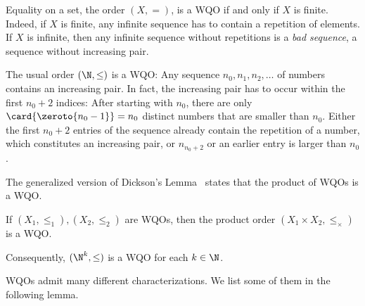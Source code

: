 \documentclass[../../diss.tex]{subfiles}
\begin{document}
\begin{example}%
\label{Example:WQO}%
    \begin{thmenumerate}[a)]
        \item
            Equality on a set, \ie the order $(X,=)$, is a WQO if and only if $X$ is finite.
            Indeed, if $X$ is finite, any infinite sequence has to contain a repetition of elements.
            If $X$ is infinite, then any infinite sequence without repetitions is a \emph{bad sequence}, a sequence without increasing pair.
        \item\label{Example:WQONaturals}
            The usual order $(\N,\leq)$ is a WQO:\@
            Any sequence $n_0, n_1, n_2, \ldots$ of numbers contains an increasing pair.
            In fact, the increasing pair has to occur within the first $n_0+2$ indices:
            After starting with $n_0$, there are only $\card{\zeroto{n_0-1}} = n_0$ distinct numbers that are smaller than $n_0$.
            Either the first $n_0+2$ entries of the sequence already contain the repetition of a number, which constitutes an increasing pair, or $n_{n_0 + 2}$ or an earlier entry is larger than $n_0$.
    \end{thmenumerate}
\end{example}

The generalized version of Dickson's Lemma~\cite{Dickson13} states that the product of WQOs is a WQO.\@

\begin{lemma}%
\label{Lemma:WSTSDickson}%
    If $(X_1,\leq_1), (X_2,\leq_2)$ are WQOs, then the product order $(X_1 \times X_2, \leq_\times)$ is a WQO.\@
\end{lemma}

Consequently, $(\N^k,\leq)$ is a WQO for each $k \in \N$.

%
\cheatpagebreak
%

WQOs admit many different characterizations.
We list some of them in the following lemma.
\end{document}
